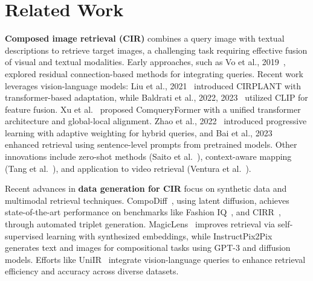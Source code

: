 \FloatBarrier
\section{Related Work}
\textbf{Composed image retrieval (CIR)} combines a query image with textual descriptions to retrieve target images, a challenging task requiring effective fusion of visual and textual modalities. Early approaches, such as Vo et al., 2019~\cite{Vo_2019_CVPR}, explored residual connection-based methods for integrating queries. Recent work leverages vision-language models: Liu et al., 2021~\cite{Liu_2021_ICCV} introduced CIRPLANT with transformer-based adaptation, while Baldrati et al., 2022, 2023~\cite{Baldrati_2022_CVPR,baldrati2023composedimageretrievalusing} utilized CLIP for feature fusion. Xu et al.~\cite{10.1109/TMM.2023.3235495} proposed ComqueryFormer with a unified transformer architecture and global-local alignment. Zhao et al., 2022~\cite{zhao2022progressivelearningimageretrieval} introduced progressive learning with adaptive weighting for hybrid queries, and Bai et al., 2023~\cite{bai2023sentencelevelpromptsbenefitcomposed} enhanced retrieval using sentence-level prompts from pretrained models. Other innovations include zero-shot methods (Saito et al.~\cite{Saito_2023_CVPR}), context-aware mapping (Tang et al.~\cite{Tang_Yu_Gai_Zhuang_Xiong_Hu_Wu_2024}), and application to video retrieval (Ventura et al.~\cite{Ventura_2024}).

Recent advances in \textbf{data generation for CIR} focus on synthetic data and multimodal retrieval techniques. CompoDiff~\cite{gu2024compodiffversatilecomposedimage}, using latent diffusion, achieves state-of-the-art performance on benchmarks like Fashion IQ~\cite{wu2020fashioniqnewdataset}, and CIRR~\cite{Liu_2021_ICCV}, through automated triplet generation. MagicLens~\cite{zhang2024magiclensselfsupervisedimageretrieval} improves retrieval via self-supervised learning with synthesized embeddings, while InstructPix2Pix~\cite{brooks2023instructpix2pixlearningfollowimage} generates text and images for compositional tasks using GPT-3 and diffusion models. Efforts like UniIR~\cite{wei2023uniirtrainingbenchmarkinguniversal} integrate vision-language queries to enhance retrieval efficiency and accuracy across diverse datasets.

